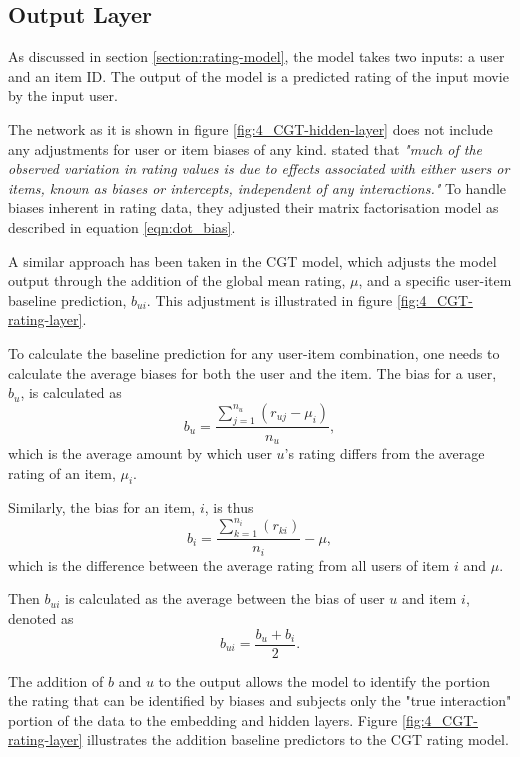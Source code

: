 \subsection{Output Layer}
As discussed in section \ref{section:rating-model}, the model takes two inputs: a user and an item ID. The output of the model is a predicted rating of the input movie by the input user. 

The network as it is shown in figure \ref{fig:4_CGT-hidden-layer} does not include any adjustments for user or item biases of any kind. \citeauthor{koren2009matrix} stated that \textit{"much of the observed variation in rating values is due to effects associated with either users or items, known as biases or intercepts, independent of any interactions."} To handle biases inherent in rating data, they adjusted their matrix factorisation model as described in equation \ref{eqn:dot_bias}.

A similar approach has been taken in the CGT model, which adjusts the model output through the addition of the global mean rating, $\mu$, and a specific user-item baseline prediction, $b_{ui}$. This adjustment is illustrated in figure \ref{fig:4_CGT-rating-layer}. 

To calculate the baseline prediction for any user-item combination, one needs to calculate the average biases for both the user and the item. The bias for a user, $b_u$, is calculated as 
\begin{equation}
    b_{u} = \dfrac{\sum_{j=1}^{n_u} (r_{uj} - \mu_i)}{n_u},
\label{eqn:CGT-user-bias}
\end{equation}
which is the average amount by which user $u$'s rating differs from the average rating of an item, $\mu_i$.

Similarly, the bias for an item, $i$, is thus
\begin{equation}
    b_{i} = \dfrac{\sum_{k=1}^{n_i} (r_{ki})}{n_i} - \mu,
\label{eqn:CGT-item-bias}
\end{equation}
which is the difference between the average rating from all users of item $i$ and $\mu$.

Then $b_{ui}$ is calculated as the average between the bias of user $u$ and item $i$, denoted as
\begin{equation}
    b_{ui} = \dfrac{b_u + b_i}{2}.
\label{eqn:CGT-baseline}
\end{equation}

The addition of $b$ and $u$ to the output allows the model to identify the portion the rating that can be identified by biases and subjects only the "true interaction" portion of the data to the embedding and hidden layers. Figure \ref{fig:4_CGT-rating-layer} illustrates the addition baseline predictors to the CGT rating model.

